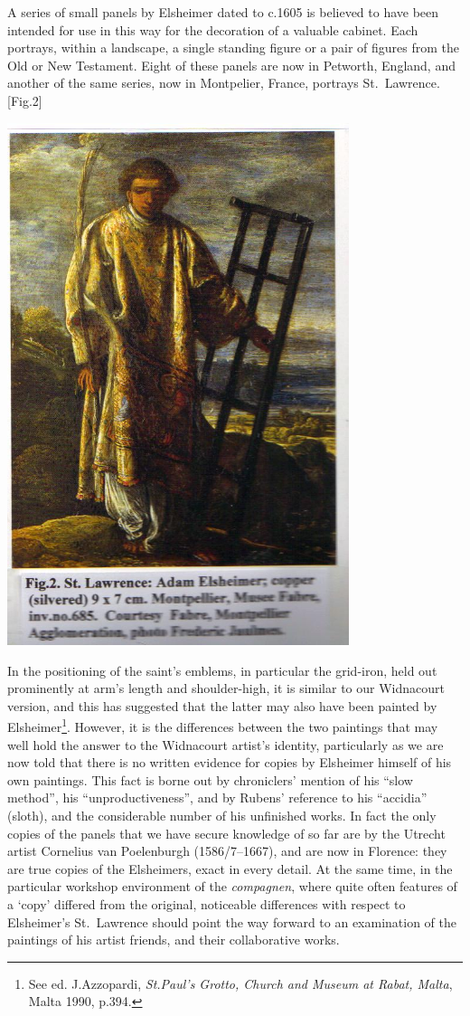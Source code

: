 \documentclass[a4paper,12pt]{article}
\begin{document}
A series of small panels by Elsheimer dated to c.1605 is believed to
have been intended for use in this way for the decoration of a
valuable cabinet.  Each portrays, within a landscape, a single
standing figure or a pair of figures from the Old or New Testament.
Eight of these panels are now in Petworth, England, and another of the
same series, now in Montpelier, France, portrays St.~Lawrence.[Fig.2]
\begin{center}
\includegraphics[width=10cm]{fig2.jpg}
\end{center}
In the positioning of the saint's emblems, in particular the
grid-iron, held out prominently at arm's length and shoulder-high, it
is similar to our Widnacourt version, and this has suggested that the
latter may also have been painted by Elsheimer\footnote{See
  ed. J.Azzopardi, \textit{St.Paul's Grotto, Church and Museum at
    Rabat, Malta}, Malta 1990, p.394.}. However, it is the differences
between the two paintings that may well hold the answer to the
Widnacourt artist's identity, particularly as we are now told that
there is no written evidence for copies by Elsheimer himself of his
own paintings.  This fact is borne out by chroniclers' mention of his
``slow method'', his ``unproductiveness'', and by Rubens' reference to
his ``accidia'' (sloth), and the considerable number of his unfinished
works.  In fact the only copies of the panels that we have secure
knowledge of so far are by the Utrecht artist Cornelius van
Poelenburgh (1586/7--1667), and are now in Florence: they are true
copies of the Elsheimers, exact in every detail.  At the same time, in
the particular workshop environment of the \textit{compagnen}, where
quite often features of a `copy' differed from the original,
noticeable differences with respect to Elsheimer's St.~Lawrence should
point the way forward to an examination of the paintings of his artist
friends, and their collaborative works.
\end{document}
